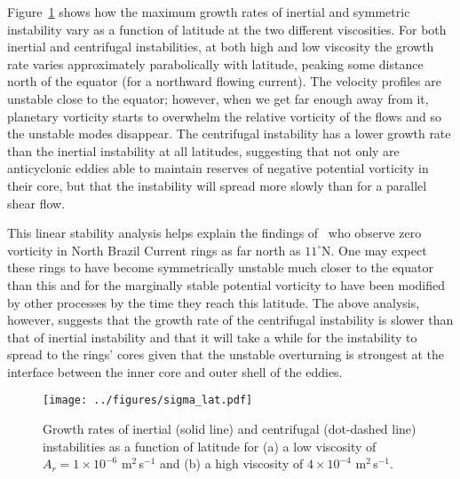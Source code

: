 Figure~\ref{fig:SigmaAndLat} shows how the maximum growth rates of inertial and symmetric instability vary as a function of latitude at the two different viscosities. For both inertial and centrifugal instabilities, at both high and low viscosity the growth rate varies approximately parabolically with latitude, peaking some distance north of the equator (for a northward flowing current). The velocity profiles are unstable close to the equator; however, when we get far enough away from it, planetary vorticity starts to overwhelm the relative vorticity of the flows and so the unstable modes disappear. The centrifugal instability has a lower growth rate than the inertial instability at all latitudes, suggesting that not only are anticyclonic eddies able to maintain reserves of negative potential vorticity in their core, but that the instability will spread more slowly than for a parallel shear flow.

This linear stability analysis helps explain the findings of~\citet{Castelao2011} who observe zero vorticity in North Brazil Current rings as far north as $11^\circ$N. One may expect these rings to have become symmetrically unstable much closer to the equator than this and for the marginally stable potential vorticity to have been modified by other processes by the time they reach this latitude. The above analysis, however, suggests that the growth rate of the centrifugal instability is slower than that of inertial instability and that it will take a while for the instability to spread to the rings' cores given that the unstable overturning is strongest at the interface between the inner core and outer shell of the eddies.

\begin{figure}
    \centering
    \texttt{[image: ../figures/sigma\_lat.pdf]}
    \caption{Growth rates of inertial (solid line) and centrifugal (dot-dashed line) instabilities as a function of latitude for (a) a low viscosity of $A_r = 1 \times 10^{-6}$ m$^2\,$s$^{-1}$ and (b) a high viscosity of $4 \times 10^{-4}$ m$^2\,$s$^{-1}$.}
    \label{fig:SigmaAndLat}
\end{figure}

